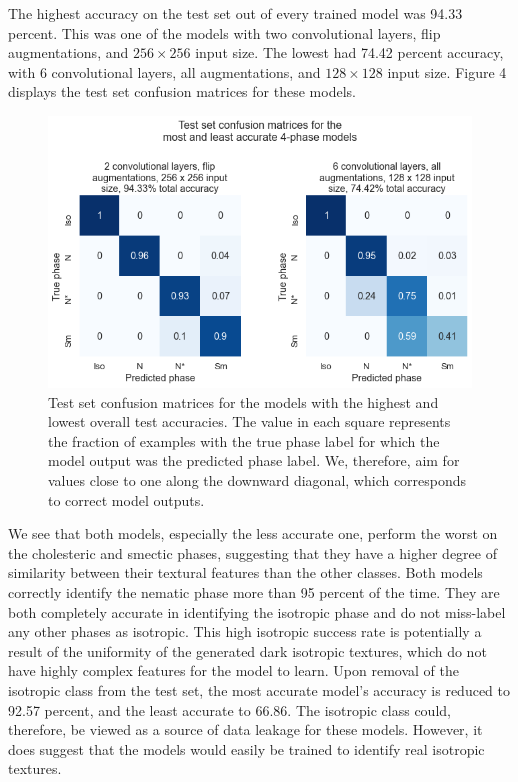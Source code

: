 \documentclass[12pt]{article}
\begin{document}
The highest accuracy on the test set out of every trained model was 94.33 percent. This was one of the models with two convolutional layers, flip augmentations, and $256 \times 256$ input size. The lowest had 74.42 percent accuracy, with 6 convolutional layers, all augmentations, and $128 \times 128$ input size. Figure 4 displays the test set confusion matrices for these models.
\begin{figure}[!htb]
	\centering
    \includegraphics[width=6in]{images/confusion_matrix.png}
    \caption{Test set confusion matrices for the models with the highest and lowest overall test accuracies. The value in each square represents the fraction of examples with the true phase label for which the model output was the predicted phase label. We, therefore, aim for values close to one along the downward diagonal, which corresponds to correct model outputs.}
\end{figure} 
We see that both models, especially the less accurate one, perform the worst on the cholesteric and smectic phases, suggesting that they have a higher degree of similarity between their textural features than the other classes. Both models correctly identify the nematic phase more than 95 percent of the time. They are both completely accurate in identifying the isotropic phase and do not miss-label any other phases as isotropic. This high isotropic  success rate is potentially a result of the uniformity of the generated dark isotropic textures, which do not have highly complex features for the model to learn. Upon removal of the isotropic class from the test set, the most accurate model's accuracy is reduced to 92.57 percent, and the least accurate to 66.86. The isotropic class could, therefore, be viewed as a source of data leakage for these models. However, it does suggest that the models would easily be trained to identify real isotropic textures. 
\end{document}

